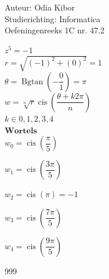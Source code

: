 \documentclass[a4paper]{article}
\begin{document}
  
\noindent \large Auteur: Odia Kibor \\
\noindent \large Studierichting: Informatica\\
\noindent \large Oefeningenreeks 1C nr. 47.2\\

\medskip

\normalsize

$ z^5 = -1$\\

$ r = \sqrt{(-1)^2 + (0)^2} = 1$\\

$ \theta = \operatorname{Bgtan}\left (-\dfrac{0}{1} \right) =\pi$\\

$ w = \sqrt[n]{r} \operatorname{cis} \left( \dfrac{\theta + k 2 \pi}{n} \right)$\\

$k \in {0,1,2,3,4}$\\

$\textbf{Wortels}$\\

$w_0 = \operatorname{cis} \left(\dfrac{\pi}{5}\right)$

$w_1 = \operatorname{cis} \left(\dfrac{3\pi}{5}\right)$

$w_2 = \operatorname{cis} \left(\pi\right) = -1$

$w_3 = \operatorname{cis} \left(\dfrac{7\pi}{5}\right)$

$w_4 = \operatorname{cis} \left(\dfrac{9\pi}{5}\right)$











\begin{thebibliography}{999}
\end{thebibliography}
\end{document}
